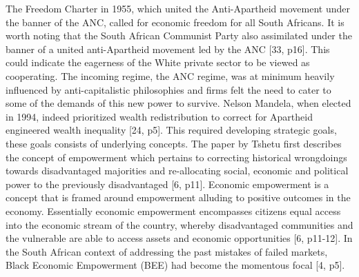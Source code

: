 The Freedom Charter in 1955, which united the Anti-Apartheid movement under the banner of the ANC, called for economic freedom for all South Africans. It is worth noting that the South African Communist Party also assimilated under the banner of a united anti-Apartheid movement led by the ANC [33, p16]. This could indicate the eagerness of the White private sector to be viewed as cooperating. The incoming regime, the ANC regime, was at minimum heavily influenced by anti-capitalistic philosophies and firms felt the need to cater to some of the demands of this new power to survive. Nelson Mandela, when elected in 1994, indeed prioritized wealth redistribution to correct for Apartheid engineered wealth inequality [24, p5]. This required developing strategic goals, these goals consists of underlying concepts. The paper by Tshetu first describes the concept of empowerment which pertains to correcting historical wrongdoings towards disadvantaged majorities and re-allocating social, economic and political power to the previously disadvantaged [6, p11]. Economic empowerment is a concept that is framed around empowerment alluding to positive outcomes in the economy. Essentially economic empowerment encompasses citizens equal access into the economic stream of the country, whereby disadvantaged communities and the vulnerable are able to access assets and economic opportunities [6, p11-12]. In the South African context of addressing the past mistakes of failed markets, Black Economic Empowerment (BEE) had become the momentous focal [4, p5].

